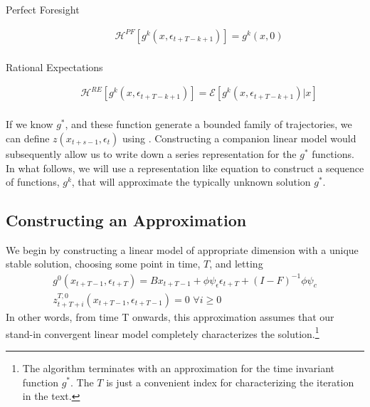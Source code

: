 \documentclass[12pt]{article}
\begin{document}
\begin{description}
\item[Perfect Foresight]
\begin{gather*}
     \mathcal{H}^{PF}[g^{k}(x,\epsilon_{t+T-k+1})]=
g^{k}(x,0)\\
\end{gather*}


\item[Rational Expectations] 
\begin{gather*}
     \mathcal{H}^{RE}[g^{k}(x,\epsilon_{t+T-k+1})]=
\mathcal{E}[g^{k}(x,\epsilon_{t+T-k+1})|x]\\
\end{gather*}

 \end{description}












If we know $g^\ast$, and  these function generate a bounded family of 
trajectories, we can define $z(x_{t+s-1},\epsilon_t)$ using .
Constructing a companion linear model would subsequently allow 
 us to write down a series representation for the $g^\ast$ functions. 
In what follows, we will use a representation like equation  
to construct a sequence of functions, $g^k$, 
that will approximate the typically unknown solution $g^\ast$.

\subsection{Constructing an Approximation}
\label{sec:constr-an-appr}

We begin by constructing a linear model of appropriate dimension 
with a unique stable solution,
choosing some point in time, $T$, and
letting
 \begin{gather}
 g^0(x_{t+T-1},\epsilon_{t+T})=  
B x_{t+T-1}+ \phi \psi_\epsilon\epsilon_{t+T} +
 (I - F)^{-1} \phi \psi_c\\ \label{firstIter}
z^{T,0}_{t+T+i}(x_{t+T-1},\epsilon_{t+T-1})=0 \,\, \forall i \ge 0
 \end{gather}
In other words, from time T onwards, this approximation assumes 
that our stand-in
 convergent linear model completely characterizes the solution.\footnote{
The algorithm terminates with an approximation for 
the time invariant function $g^\ast$.
The $T$ is just a convenient index for 
characterizing the iteration in the text.  }
\end{document}
